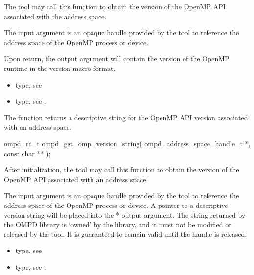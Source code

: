 \descr
The tool may call this function to obtain the version of the OpenMP API associated with the address space.

\argdesc
The input argument  is an opaque handle provided by the tool
to reference the address space of the OpenMP process or device.

Upon return, the output argument  will contain the version of the OpenMP runtime in the  version macro format.

\crossreferences
\begin{itemize}
	\item {} type, see 
	\item {} type, see .
\end{itemize}

\label{subsubsubsec:ompd_get_omp_version_string}

\summary
The  function returns a descriptive string for the OpenMP
API version associated with an address space.

\format

\begin{cspecific}
\begin{ompSyntax}
ompd_rc_t ompd_get_omp_version_string(
  ompd_address_space_handle_t *,
  const char **
);
\end{ompSyntax}
\end{cspecific}

\descr
After initialization, the tool may call this function to obtain the version of the OpenMP
API associated with an address space.

\argdesc
The input argument  is an opaque handle provided by the tool
to reference the address space of the OpenMP process or device.
A pointer to a descriptive version string will be placed into the * output argument.
The string returned by the
OMPD library is `owned' by the library, and it must not be modified or released by the tool.
It is guaranteed to remain valid until the  handle is released.

\crossreferences
\begin{itemize}
	\item {} type, see 
	\item {} type, see .
\end{itemize}


